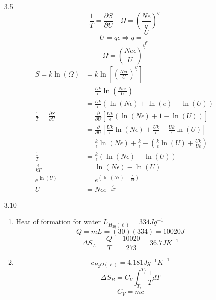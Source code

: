 \documentclass{article}
\begin{document}
\begin{enumerate}
    \item [3.5]
        \[\frac{1}{T} = \frac{\partial S}{\partial U} \quad \Omega = \left( \frac{Ne}{q} \right)^q\]
        \[U = q \epsilon \Rightarrow q = \frac{U}{\epsilon}\]
        \[\Omega = \left( \frac{Ne \epsilon}{U} \right)^{\frac{U}{\epsilon}}\]
        \begin{align*}
            S = k \ln(\Omega) &= k\ln\left[ \left( \frac{Ne \epsilon}{U} \right)^{\frac{U}{\epsilon}} \right] \\
            &= \frac{Uk}{\epsilon} \ln\left( \frac{Ne \epsilon}{U} \right) \\
            &= \frac{Uk}{\epsilon}(\ln(N \epsilon) + \ln(e) - \ln(U)) \\
            \frac{1}{T} = \frac{\partial S}{\partial U} &= \frac{\partial}{\partial U}\left[ \frac{Uk}{\epsilon}(\ln(N \epsilon) + 1 - \ln(U)) \right] \\
            &= \frac{\partial}{\partial U}\left[ \frac{Uk}{\epsilon} \ln(N \epsilon) + \frac{Uk}{\epsilon} - \frac{Uk}{\epsilon} \ln(U) \right] \\
            &= \frac{k}{\epsilon} \ln(N \epsilon) + \frac{k}{\epsilon} - \left( \frac{k}{\epsilon} \ln(U) + \frac{Uk}{U \epsilon} \right) \\
            \frac{1}{T} &= \frac{k}{\epsilon} (\ln(N \epsilon) - \ln(U)) \\
            \frac{\epsilon}{kT} &= \ln(N \epsilon) - \ln(U) \\
            e^{\ln(U)} &= e^{\left( \ln(N \epsilon) - \frac{\epsilon}{kT} \right)} \\
            U &= N \epsilon e^{-\frac{\epsilon}{kT}}
        \end{align*}
    \vspace{0.1in}
    \item [3.10]
        \begin{enumerate}
            \item
                Heat of formation for water \(L_{H_20(\ell)} = 334 Jg^{-1}\)
                \[Q = mL = (30)(334) = 10020 J\]
                \[\Delta S_A = \frac{Q}{T} = \frac{10020}{273} = 36.7 JK^{-1}\]
            \item
                \[c_{H_2O(\ell)} = 4.181 Jg^{-1}K^{-1}\]
                \[\Delta S_B = C_V \int_{T_i}^{T_f} \frac{1}{T} dT\]
                \[C_V = mc\]

\end{enumerate}
\end{enumerate}
\end{document}
